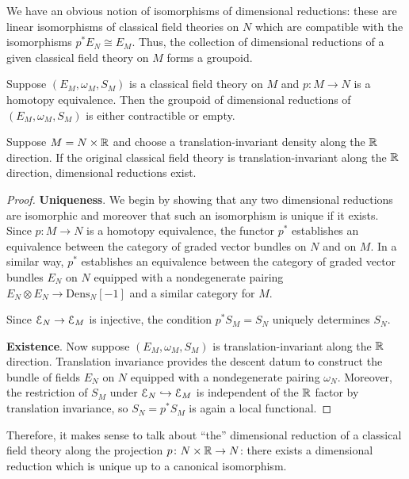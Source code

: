 \documentclass[10pt, oneside]{article}
\newcommand{\Dens}{\mathrm{Dens}}
\begin{document}
We have an obvious notion of isomorphisms of dimensional reductions: these are linear isomorphisms of classical field theories on $N$ which are compatible with the isomorphisms $p^* E_N\cong E_M$. Thus, the collection of dimensional reductions of a given classical field theory on $M$ forms a groupoid.

\begin{prop}
Suppose $(E_M, \omega_M, S_M)$ is a classical field theory on $M$ and $p\colon M\rightarrow N$ is a homotopy equivalence. Then the groupoid of dimensional reductions of $(E_M, \omega_M, S_M)$ is either contractible or empty.

Suppose $M=N\times \mathbb R$ and choose a translation-invariant density along the $\mathbb R$ direction. If the original classical field theory is translation-invariant along the $\mathbb R$ direction, dimensional reductions exist.
\label{prop:dimensionalreductionunique}
\end{prop}
\begin{proof} \textbf{Uniqueness}. We begin by showing that any two dimensional reductions are isomorphic and moreover that such an isomorphism is unique if it exists. Since $p\colon M\rightarrow N$ is a homotopy equivalence, the functor $p^*$ establishes an equivalence between the category of graded vector bundles on $N$ and on $M$. In a similar way, $p^*$ establishes an equivalence between the category of graded vector bundles $E_N$ on $N$ equipped with a nondegenerate pairing $E_N\otimes E_N\rightarrow \Dens_N[-1]$ and a similar category for $M$.

Since $\mathcal E_N\rightarrow \mathcal E_M$ is injective, the condition $p^* S_M = S_N$ uniquely determines $S_N$.

\textbf{Existence}. Now suppose $(E_M, \omega_M, S_M)$ is translation-invariant along the $\mathbb R$ direction. Translation invariance provides the descent datum to construct the bundle of fields $E_N$ on $N$ equipped with a nondegenerate pairing $\omega_N$. Moreover, the restriction of $S_M$ under $\mathcal E_N\hookrightarrow \mathcal E_M$ is independent of the $\mathbb R$ factor by translation invariance, so $S_N=p^* S_M$ is again a local functional.
\end{proof}

\begin{remark}
Therefore, it makes sense to talk about ``the'' dimensional reduction of a classical field theory along the projection $p \colon N \times \mathbb R \to N$: there exists a dimensional reduction which is unique up to a canonical isomorphism.
\end{remark}
\end{document}
